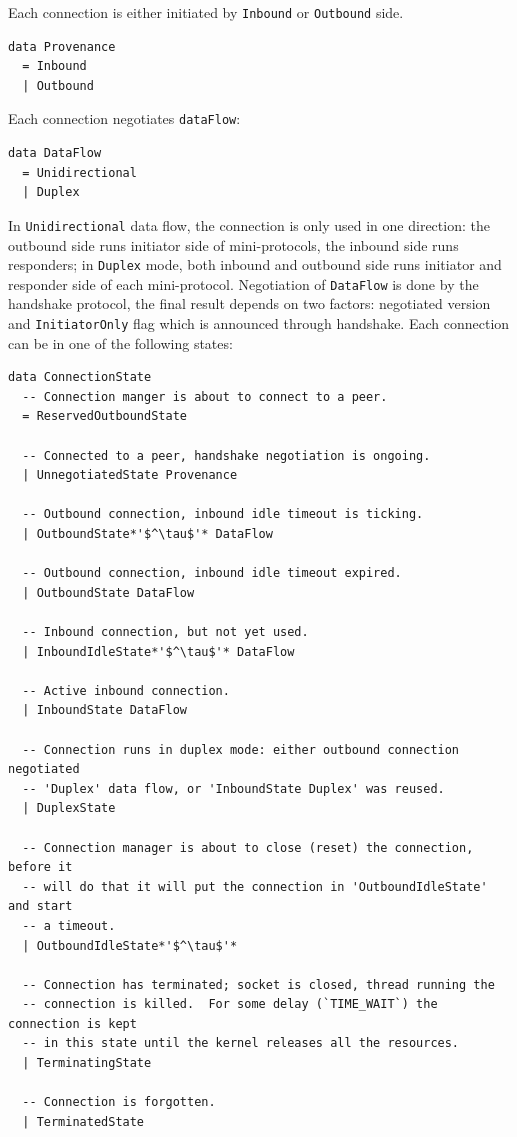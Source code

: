 Each connection is either initiated by \texttt{Inbound} or \texttt{Outbound} side.

\begin{lstlisting}
data Provenance
  = Inbound
  | Outbound
\end{lstlisting}
Each connection negotiates \texttt{dataFlow}:
\begin{lstlisting}
data DataFlow
  = Unidirectional
  | Duplex
\end{lstlisting}

In \texttt{Unidirectional} data flow, the connection is only used in one direction:
the outbound side runs initiator side of mini-protocols, the inbound side runs
responders; in \texttt{Duplex} mode, both inbound and outbound side runs
initiator and responder side of each mini-protocol. Negotiation of
\texttt{DataFlow} is done by the handshake protocol, the final result depends
on two factors: negotiated version and \texttt{InitiatorOnly} flag which is
announced through handshake. Each connection can be in one of the following
states:

\begin{lstlisting}
data ConnectionState
  -- Connection manger is about to connect to a peer.
  = ReservedOutboundState

  -- Connected to a peer, handshake negotiation is ongoing.
  | UnnegotiatedState Provenance

  -- Outbound connection, inbound idle timeout is ticking.
  | OutboundState*'$^\tau$'* DataFlow

  -- Outbound connection, inbound idle timeout expired.
  | OutboundState DataFlow

  -- Inbound connection, but not yet used.
  | InboundIdleState*'$^\tau$'* DataFlow

  -- Active inbound connection.
  | InboundState DataFlow

  -- Connection runs in duplex mode: either outbound connection negotiated
  -- 'Duplex' data flow, or 'InboundState Duplex' was reused.
  | DuplexState

  -- Connection manager is about to close (reset) the connection, before it
  -- will do that it will put the connection in 'OutboundIdleState' and start
  -- a timeout.
  | OutboundIdleState*'$^\tau$'*

  -- Connection has terminated; socket is closed, thread running the
  -- connection is killed.  For some delay (`TIME_WAIT`) the connection is kept
  -- in this state until the kernel releases all the resources.
  | TerminatingState

  -- Connection is forgotten.
  | TerminatedState
\end{lstlisting}

